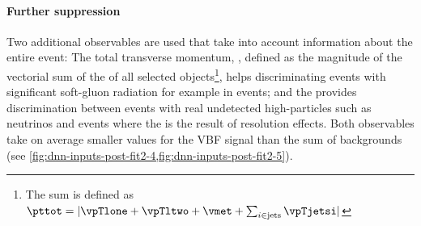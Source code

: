 \paragraph{Further suppression}
Two additional observables are used that take into account information about the entire event:
The total transverse momentum, \pttot, defined as the magnitude of the vectorial sum of the \pT of all selected objects\footnote{The sum is defined as $\pttot = | \vpTlone + \vpTltwo + \vmet + \sum_{i \in \text{jets}} \vpTjetsi |$}, helps discriminating events with significant soft-gluon radiation for example in \ttbar events; and the \METSig provides discrimination between events with real undetected high-\pT particles such as neutrinos and events where the \MET is the result of resolution effects. Both observables take on average smaller values for the VBF signal than the sum of backgrounds (see \cref{fig:dnn-inputs-post-fit2-4,fig:dnn-inputs-post-fit2-5}). 

